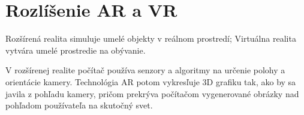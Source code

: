 \documentclass[10pt,twoside,slovak,a4paper]{article}
\begin{document}
%
%



\section{Rozlíšenie AR a VR} \label{vuz}
Rozšírená realita simuluje umelé objekty v reálnom prostredí; Virtuálna realita vytvára umelé prostredie na obývanie.\vspace{5mm}

V rozšírenej realite počítač používa senzory a algoritmy na určenie polohy a orientácie kamery. Technológia AR potom vykresľuje 3D grafiku tak, ako by sa javila z pohľadu kamery, pričom prekrýva počítačom vygenerované obrázky nad pohľadom používateľa na skutočný svet.\cite{hayes_2021}\vspace{5mm}
\end{document}
